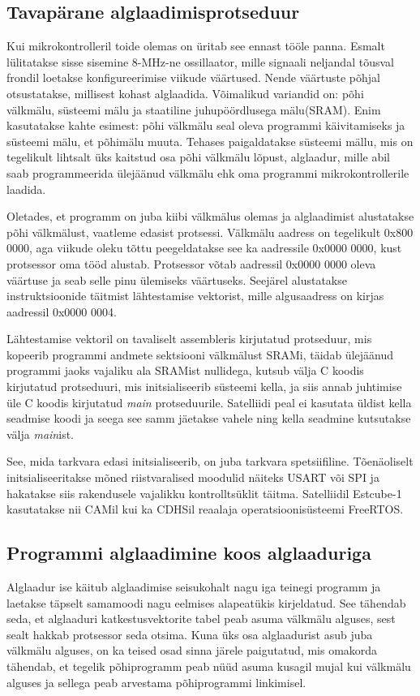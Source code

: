 \documentclass[12pt,a4paper]{article}
\begin{document}
\subsection{Tavapärane alglaadimisprotseduur}
\label{sec:boot:tava}
Kui mikrokontrolleril toide olemas on üritab see ennast tööle panna.
Esmalt lülitatakse sisse sisemine 8-MHz-ne ossillaator, mille signaali
neljandal tõusval frondil loetakse konfigureerimise viikude väärtused. Nende
väärtuste põhjal otsustatakse, millisest kohast alglaadida. Võimalikud
variandid on: põhi välkmälu, süsteemi mälu ja staatiline juhupöördlusega
mälu(SRAM).  Enim kasutatakse kahte esimest: põhi välkmälu seal oleva programmi
käivitamiseks ja süsteemi mälu, et põhimälu muuta. Tehases paigaldatakse
süsteemi mällu, mis on tegelikult lihtsalt üks kaitstud osa põhi välkmälu
lõpust, alglaadur, mille abil saab programmeerida ülejäänud välkmälu ehk oma
programmi mikrokontrollerile laadida.

Oletades, et programm on juba kiibi välkmälus olemas ja alglaadimist
alustatakse põhi välkmälust, vaatleme edasist protsessi. Välkmälu aadress on
tegelikult 0x800 0000, aga viikude oleku tõttu peegeldatakse see ka aadressile
0x0000 0000, kust protsessor oma tööd alustab.  Protsessor võtab aadressil
0x0000 0000 oleva väärtuse ja seab selle pinu ülemiseks väärtuseks. Seejärel
alustatakse instruktsioonide täitmist lähtestamise vektorist, mille
algusaadress on kirjas aadressil 0x0000 0004. \cite{f1rm}

Lähtestamise vektoril on tavaliselt assembleris kirjutatud protseduur, mis
kopeerib programmi andmete sektsiooni välkmälust SRAMi, täidab ülejäänud
programmi jaoks vajaliku ala SRAMist nullidega, kutsub välja C koodis kirjutatud
protseduuri, mis initsialiseerib süsteemi kella, ja siis annab juhtimise üle C
koodis kirjutatud \textit{main} protseduurile. Satelliidi peal ei kasutata
üldist kella seadmise koodi ja seega see samm jäetakse vahele ning kella
seadmine kutsutakse välja \textit{main}ist.

See, mida tarkvara edasi initsialiseerib, on juba tarkvara spetsiifiline.
Tõenäoliselt initsialiseeritakse mõned riistvaralised moodulid näiteks USART või
SPI ja hakatakse siis rakendusele vajalikku kontrolltsüklit täitma. Satelliidil
Estcube-1 kasutatakse nii CAMil kui ka CDHSil reaalaja operatsioonisüsteemi
FreeRTOS.

\subsection{Programmi alglaadimine koos alglaaduriga}
Alglaadur ise käitub alglaadimise seisukohalt nagu iga teinegi programm ja
laetakse täpselt samamoodi nagu eelmises alapeatükis kirjeldatud. See tähendab
seda, et alglaaduri katkestusvektorite tabel peab asuma välkmälu alguses, sest
sealt hakkab protsessor seda otsima. Kuna üks osa alglaadurist asub juba
välkmälu alguses, on ka teised osad sinna järele paigutatud, mis omakorda
tähendab, et tegelik põhiprogramm peab nüüd asuma kusagil mujal kui välkmälu
alguses ja sellega peab arvestama põhiprogrammi linkimisel.
\end{document}
